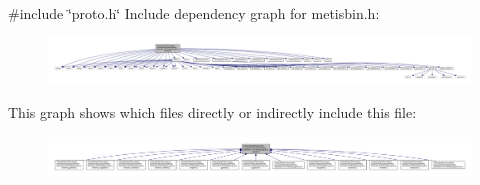 {\ttfamily \#include \char`\"{}proto.\+h\char`\"{}}\newline
Include dependency graph for metisbin.\+h\+:\nopagebreak
\begin{figure}[H]
\begin{center}
\leavevmode
\includegraphics[width=350pt]{a00321}
\end{center}
\end{figure}
This graph shows which files directly or indirectly include this file\+:\nopagebreak
\begin{figure}[H]
\begin{center}
\leavevmode
\includegraphics[width=350pt]{a00322}
\end{center}
\end{figure}
